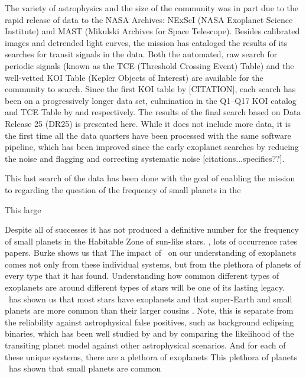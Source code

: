 The variety of astrophysics and the size of the \Kepler{} community was in part due to the rapid release of \Kepler{} data to the NASA Archives: NExScI (NASA Exoplanet Science Institute) and MAST (Mikulski Archives for Space Telescope).  Besides calibrated images and detrended light curves, the mission has cataloged the results of its searches for transit signals in the data. Both the automated, raw search for periodic signals (known as the TCE (Threshold Crossing Event) Table) and the well-vetted KOI Table (Kepler Objects of Interest) are available for the community to search.  Since the first KOI table by \citet{Borucki2011}[CITATION], each search has been on a progressively longer data set, culmination in the Q1--Q17 KOI catalog and TCE Table by \citet{Coughlin2016} and \citet{Seader2015} respectively.  The results of the final search based on Data Release 25 (DR25) is presented here. While it does not include more data, it is the first time all the data quarters have been processed with the same software pipeline, which has been improved since the early exoplanet searches by reducing the noise and flagging and correcting systematic noise [citations...specifics??].

This last search of the data has been done with the goal of enabling the mission to regarding the question of the frequency of small planets in the 
 

This large 

Despite all of \Keplers successes it has not produced a definitive number for the frequency of small planets in the Habitable Zone of sun-like stars. \citet{Dressing20??}, lots of occurrence rates papers.   Burke shows us that 
The impact of \Kepler\ on our understanding of exoplanets comes not only from these individual systems, but from the plethora of planets of every type that it has found. Understanding how common different types of exoplanets are around different types of stars will be one of its lasting legacy. \Kepler\ has shown us that most stars have exoplanets and that super-Earth and small planets are more common than their larger cousins \citet{Burke2015}.  
Note, this is separate from the reliability against astrophysical false positives, such as background eclipsing binaries, which has been well studied by \citet{Morton2016} and \citet{Torres2012} by comparing the likelihood of the transiting planet model against other astrophysical scenarios.
And for each of these unique systems, there are a plethora of exoplanets This plethora of planets \Kepler\ has shown that small planets are common 

